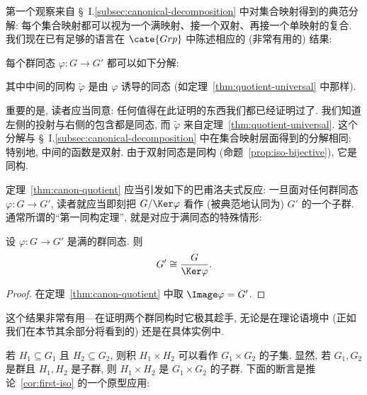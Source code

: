 第一个观察来自 \S~I.\ref{subsec:canonical-decomposition} 中对集合映射得到的典范分解: 每个集合映射都可以视为一个满映射、接一个双射、再接一个单映射的复合. 我们现在已有足够的语言在 $\cate{Grp}$ 中陈述相应的 (非常有用的) 结果:

\begin{theorem}
\label{thm:canon-quotient}
每个群同态 $\varphi : G \to G'$ 都可以如下分解:
\begin{center}
\end{center}
其中中间的同构 $\tilde{\varphi}$ 是由 $\varphi$ 诱导的同态 (如定理~\ref{thm:quotient-universal} 中那样).
\end{theorem}

重要的是, 读者应当同意: 任何值得在此证明的东西我们都已经证明过了. 我们知道左侧的投射与右侧的包含都是同态, 而 $\tilde{\varphi}$ 来自定理~\ref{thm:quotient-universal}. 这个分解与 \S~I.\ref{subsec:canonical-decomposition} 中在集合映射层面得到的分解相同; 特别地, 中间的函数是双射. 由于双射同态是同构 (命题~\ref{prop:iso-bijective}), 它是同构.

定理~\ref{thm:canon-quotient} 应当引发如下的巴甫洛夫式反应: 一旦面对任何群同态 $\varphi : G \to G'$, 读者就应当即刻把 $G/\Ker \varphi$ 看作 (被典范地认同为) $G'$ 的一个子群. 通常所谓的``第一同构定理'', 就是对应于满同态的特殊情形:

\begin{corollary}
\label{cor:first-iso}
设 $\varphi : G \to G'$ 是满的群同态. 则
\[
G' \cong \frac{G}{\Ker \varphi}.
\]
\end{corollary}

\begin{proof}
在定理~\ref{thm:canon-quotient} 中取 $\Image \varphi = G'$.
\end{proof}

这个结果非常有用---在证明两个群同构时它极其趁手, 无论是在理论语境中 (正如我们在本节其余部分将看到的) 还是在具体实例中.

\begin{example}
\label{ex:product-subgroups}
若 $H_1 \subseteq G_1$ 且 $H_2 \subseteq G_2$, 则积 $H_1 \times H_2$ 可以看作 $G_1 \times G_2$ 的子集. 显然, 若 $G_1, G_2$ 是群且 $H_1, H_2$ 是子群, 则 $H_1 \times H_2$ 是 $G_1 \times G_2$ 的子群. 下面的断言是推论~\ref{cor:first-iso} 的一个原型应用:
\end{example}

